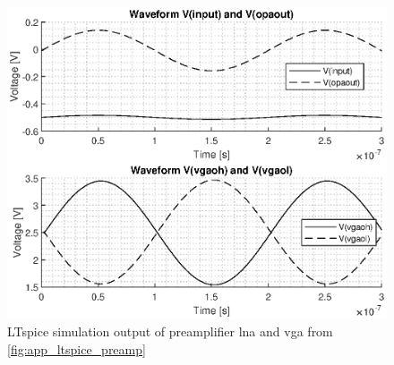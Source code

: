 \begin{figure}[htbp]
	\centering
	\includegraphics[width=.8\textwidth]{Figures/3_preamplifier_sim_out.eps}
	\caption[LTspice simulation output of preamplifier]{LTspice simulation output of preamplifier \gls{lna} and \gls{vga} from \cref{fig:app_ltspice_preamp}}
	\label{fig:3_preamplifier_sim}
\end{figure}

